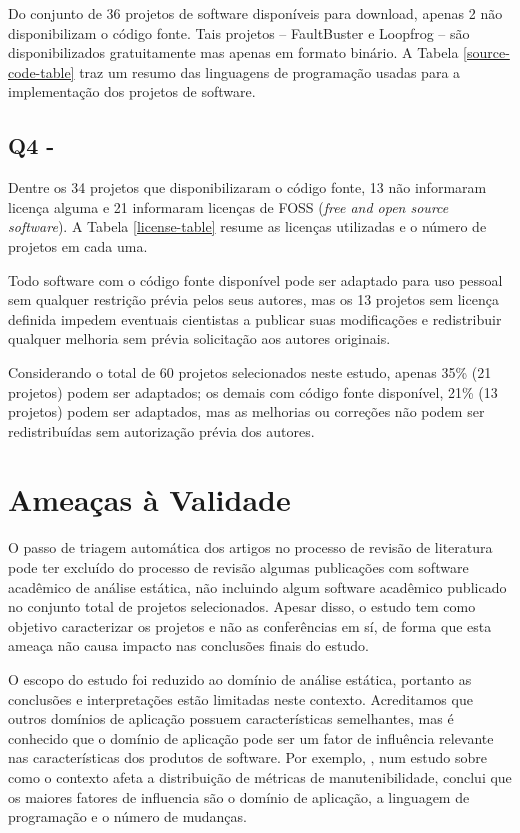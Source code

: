 Do conjunto de 36 projetos de software disponíveis para download, apenas 2 não
disponibilizam o código fonte. Tais projetos -- FaultBuster e Loopfrog --
são disponibilizados gratuitamente mas apenas em
formato binário. A Tabela \ref{source-code-table} traz um resumo das
linguagens de programação usadas para a implementação dos projetos de software.



\subsection{Q4 - \EstudoUmQuestaoQuatro} %

Dentre os 34 projetos que disponibilizaram o código fonte, 13 não informaram
licença alguma e 21 informaram licenças de FOSS ({\it free and open source
software}). A Tabela \ref{license-table} resume as licenças utilizadas e o
número de projetos em cada uma.



Todo software com o código fonte disponível pode ser adaptado para uso pessoal
sem qualquer restrição prévia pelos seus autores, mas os 13 projetos sem
licença definida impedem eventuais cientistas a publicar suas modificações e
redistribuir qualquer melhoria sem prévia solicitação aos autores originais.

Considerando o total de 60 projetos selecionados neste estudo, apenas 35\% (21
projetos) podem ser adaptados; os demais com código fonte disponível, 21\% (13 projetos) podem ser
adaptados, mas as melhorias ou correções não podem ser redistribuídas sem
autorização prévia dos autores.


\section{Ameaças à Validade} %

O passo de triagem automática dos artigos no processo de revisão de literatura
pode ter excluído do processo de revisão algumas publicações com software
acadêmico de análise estática, 
não incluindo algum software acadêmico publicado no conjunto total de projetos
selecionados. Apesar disso, o estudo tem como objetivo
caracterizar os projetos e não as conferências em sí, de forma que esta ameaça
não causa impacto nas conclusões finais do estudo.

O escopo do estudo foi reduzido ao domínio de análise estática, portanto as
conclusões e interpretações estão limitadas neste contexto. Acreditamos que
outros domínios de aplicação possuem características semelhantes, mas é
conhecido que o domínio de aplicação pode ser um fator de influência relevante nas
características dos produtos de software.
Por exemplo, , num estudo sobre como o contexto afeta
a distribuição de métricas de manutenibilidade, conclui que os maiores fatores
de influencia são o domínio de aplicação, a linguagem de programação e o número
de mudanças.

